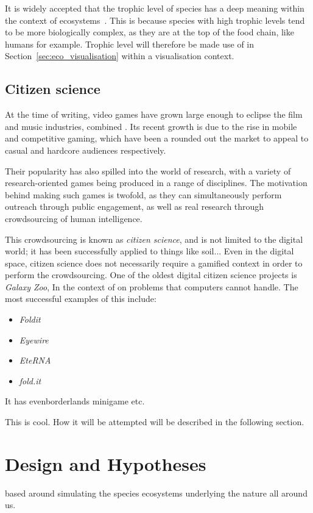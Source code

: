 It is widely accepted that the trophic level of species has a deep meaning within the context of ecosystems~\cite{Post2002}. This is because species with high trophic levels tend to be more biologically complex, as they are at the top of the food chain, like humans for example. Trophic level will therefore be made use of in Section~\ref{sec:eco_visualisation} within a visualisation context.

\subsection{Citizen science}
\label{sec:citizen_science}

At the time of writing, video games have grown large enough to eclipse the film and music industries, combined \cite{Egenfeldt-Nielsen2019}. Its recent growth is due to the rise in mobile and competitive gaming, which have been a rounded out the market to appeal to casual and hardcore audiences respectively.

Their popularity has also spilled into the world of research, with a variety of research-oriented games being produced in a range of disciplines. The motivation behind making such games is twofold, as they can simultaneously perform outreach through public engagement, as well as real research through crowdsourcing of human intelligence.

This crowdsourcing is known as \emph{citizen science}, and is not limited to the digital world; it has been successfully applied to things like soil...
Even in the digital space, citizen science does not necessarily require a gamified context in order to perform the crowdsourcing. One of the oldest digital citizen science projects is \emph{Galaxy Zoo}, \cite{Ponti2018}
In the context of on problems that computers cannot handle.
The most successful examples of this include:
\begin{itemize}
  \item \emph{Foldit}
  \item \emph{Eyewire}
  \item \emph{EteRNA}
  \item \emph{fold.it}
\end{itemize}
It has evenborderlands minigame etc.

This is cool. How it will be attempted will be described in the following section.

\section{Design and Hypotheses}
based around simulating the species ecosystems underlying the nature all around us.

